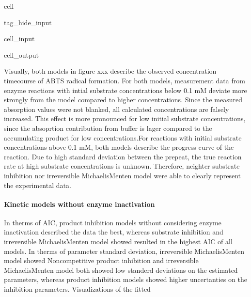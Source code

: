 \documentclass[letterpaper,10pt,english]{jupyterBook}
\begin{document}
\begin{sphinxuseclass}{cell}
\begin{sphinxuseclass}{tag_hide_input}
\begin{sphinxVerbatimInput}
\begin{sphinxuseclass}{cell_input}
\end{sphinxuseclass}\end{sphinxVerbatimInput}
\begin{sphinxVerbatimOutput}

\begin{sphinxuseclass}{cell_output}
\noindent{}

\end{sphinxuseclass}\end{sphinxVerbatimOutput}

\end{sphinxuseclass}
\end{sphinxuseclass}
\sphinxAtStartPar
{}

\sphinxAtStartPar
Visually, both models in figure xxx describe the observed concentration time\sphinxhyphen{}course of ABTS radical formation. For both models, measurement data from enzyme reactions with intial substrate concentrations below 0.1 mM deviate more strongly from the model compared to higher concentrations. Since the measured absorption values were not blanked, all calculated concentrations are falsely increased. This effect is more pronounced for low initial substrate concentrations, since the absoprtion contribution from buffer is lager compared to the accumulating product for low concentrations.For reactions with initial substrate concentrations above 0.1 mM, both models describe the progress curve of the reaction. Due to high standard deviation between the prepeat, the true reaction rate at high substrate concentrations is unknown. Therefore, neighter substrate inhibition nor irreversible Michaelis\sphinxhyphen{}Menten model were able to clearly represent the experimental data.


\paragraph{Kinetic models without enzyme inactivation}
\label{\detokenize{scenarios/enzyme_inactivation:kinetic-models-without-enzyme-inactivation}}
\sphinxAtStartPar
In therms of AIC, product inhibition models without considering enzyme inactivation described the data the best, whereas substrate inhibition and irreversible Michaelis\sphinxhyphen{}Menten model showed resulted in the highest AIC of all models. In therms of parameter standard deviation, irreversible Michaelis\sphinxhyphen{}Menten model showed
Non\sphinxhyphen{}competitive product inhibition
and irreversible Michaelis\sphinxhyphen{}Menten model both showed low standerd deviations on the estimated parameters, whereas product inhibition models showed higher uncertanties on the inhibition parameters.
Visualizations of the fitted
\end{document}
